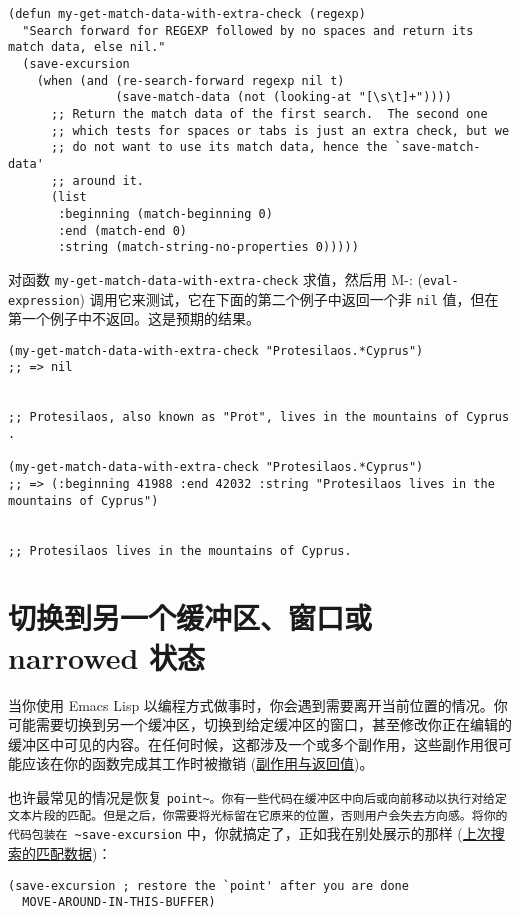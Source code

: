 \documentclass[11pt]{ctexart}
\begin{document}
\begin{verbatim}
(defun my-get-match-data-with-extra-check (regexp)
  "Search forward for REGEXP followed by no spaces and return its match data, else nil."
  (save-excursion
    (when (and (re-search-forward regexp nil t)
               (save-match-data (not (looking-at "[\s\t]+"))))
      ;; Return the match data of the first search.  The second one
      ;; which tests for spaces or tabs is just an extra check, but we
      ;; do not want to use its match data, hence the `save-match-data'
      ;; around it.
      (list
       :beginning (match-beginning 0)
       :end (match-end 0)
       :string (match-string-no-properties 0)))))
\end{verbatim}

对函数 \texttt{my-get-match-data-with-extra-check} 求值，然后用 M-: (\texttt{eval-expression}) 调用它来测试，它在下面的第二个例子中返回一个非 \texttt{nil} 值，但在第一个例子中不返回。这是预期的结果。

\begin{verbatim}
(my-get-match-data-with-extra-check "Protesilaos.*Cyprus")
;; => nil


;; Protesilaos, also known as "Prot", lives in the mountains of Cyprus   .

(my-get-match-data-with-extra-check "Protesilaos.*Cyprus")
;; => (:beginning 41988 :end 42032 :string "Protesilaos lives in the mountains of Cyprus")


;; Protesilaos lives in the mountains of Cyprus.
\end{verbatim}
\section{切换到另一个缓冲区、窗口或 narrowed 状态}
\label{sec:org943a740}
当你使用 Emacs Lisp 以编程方式做事时，你会遇到需要离开当前位置的情况。你可能需要切换到另一个缓冲区，切换到给定缓冲区的窗口，甚至修改你正在编辑的缓冲区中可见的内容。在任何时候，这都涉及一个或多个副作用，这些副作用很可能应该在你的函数完成其工作时被撤销 (\hyperref[sec:org7601617]{副作用与返回值})。

也许最常见的情况是恢复 \texttt{point\textasciitilde{}。你有一些代码在缓冲区中向后或向前移动以执行对给定文本片段的匹配。但是之后，你需要将光标留在它原来的位置，否则用户会失去方向感。将你的代码包装在 \textasciitilde{}save-excursion} 中，你就搞定了，正如我在别处展示的那样 (\hyperref[sec:org5d051bd]{上次搜索的匹配数据})：

\begin{verbatim}
(save-excursion ; restore the `point' after you are done
  MOVE-AROUND-IN-THIS-BUFFER)
\end{verbatim}
\end{document}

